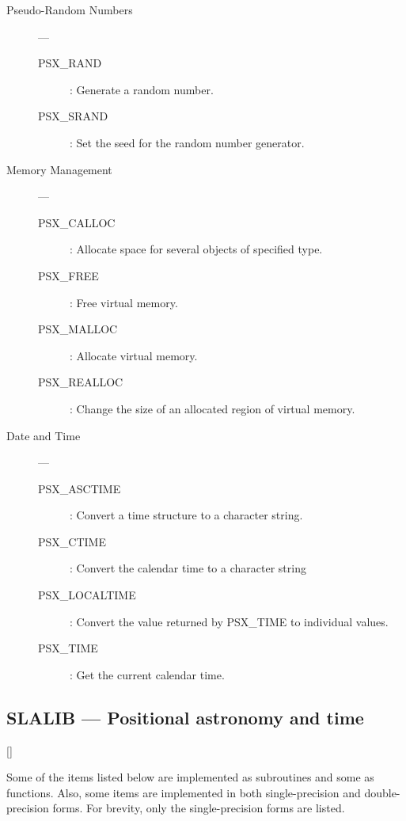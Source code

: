 \begin{description}

\item [Pseudo-Random Numbers] ---

\begin{description}
\item [PSX\_RAND] : Generate a random number.
\item [PSX\_SRAND] : Set the seed for the random number generator.
\end{description}

\item [Memory Management] ---

\begin{description}
\item [PSX\_CALLOC] : Allocate space for several objects of specified type.
\item [PSX\_FREE] : Free virtual memory.
\item [PSX\_MALLOC] : Allocate virtual memory.
\item [PSX\_REALLOC] : Change the size of an allocated region of virtual memory.
\end{description}

\item [Date and Time] ---

\begin{description}
\item [PSX\_ASCTIME] : Convert a time structure to a character string.
\item [PSX\_CTIME] : Convert the calendar time to a character string
\item [PSX\_LOCALTIME] : Convert the value returned by PSX\_TIME to individual values.
\item [PSX\_TIME] : Get the current calendar time.
\end{description}
\end{description}

\newpage

\subsection{SLALIB --- Positional astronomy and time}

\vspace{-9mm}

\hfill []

\vspace{2mm}

Some of the items listed below are implemented as subroutines and some as
functions.
Also, some items are implemented in both single-precision and double-precision
forms.
For brevity, only the single-precision forms are listed.

